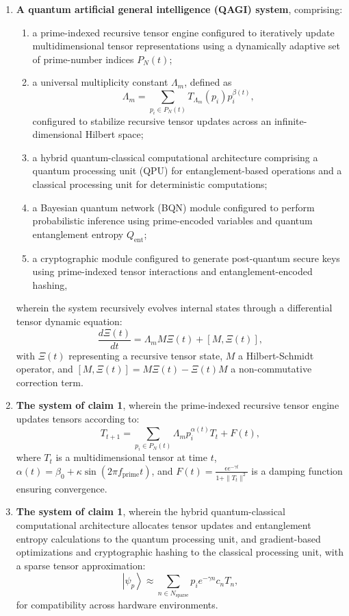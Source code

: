 \documentclass{article}
\theoremstyle{plain}
\theoremstyle{claimstyle}
\begin{document}
\begin{enumerate}

\item \textbf{A quantum artificial general intelligence (QAGI) system}, comprising:
\begin{enumerate}
    \item a prime-indexed recursive tensor engine configured to iteratively update multidimensional tensor representations using a dynamically adaptive set of prime-number indices \( P_N(t) \);
    \item a universal multiplicity constant \(\Lambda_m\), defined as 
    \[
        \Lambda_m = \sum_{p_i \in P_N(t)} T_{\Lambda_m}(p_i) p_i^{\beta(t)},
    \]
    configured to stabilize recursive tensor updates across an infinite-dimensional Hilbert space;
    \item a hybrid quantum-classical computational architecture comprising a quantum processing unit (QPU) for entanglement-based operations and a classical processing unit for deterministic computations;
    \item a Bayesian quantum network (BQN) module configured to perform probabilistic inference using prime-encoded variables and quantum entanglement entropy \( Q_{\text{ent}} \);
    \item a cryptographic module configured to generate post-quantum secure keys using prime-indexed tensor interactions and entanglement-encoded hashing,
\end{enumerate}
wherein the system recursively evolves internal states through a differential tensor dynamic equation:
\[
\frac{d\Xi(t)}{dt} = \Lambda_m M \Xi(t) + [M, \Xi(t)],
\]
with \(\Xi(t)\) representing a recursive tensor state, \(M\) a Hilbert-Schmidt operator, and \([M, \Xi(t)] = M \Xi(t) - \Xi(t) M\) a non-commutative correction term.

\item \textbf{The system of claim 1}, wherein the prime-indexed recursive tensor engine updates tensors according to:
\[
T_{t+1} = \sum_{p_i \in P_N(t)} \Lambda_m p_i^{\alpha(t)} T_t + F(t),
\]
where \( T_t \) is a multidimensional tensor at time \( t \), \( \alpha(t) = \beta_0 + \kappa \sin(2\pi f_{\text{prime}} t) \), and \( F(t) = \frac{\epsilon e^{-\gamma t}}{1 + \|T_t\|^2} \) is a damping function ensuring convergence.

\item \textbf{The system of claim 1}, wherein the hybrid quantum-classical computational architecture allocates tensor updates and entanglement entropy calculations to the quantum processing unit, and gradient-based optimizations and cryptographic hashing to the classical processing unit, with a sparse tensor approximation:
\[
\left| \psi_p \right\rangle \approx \sum_{n \in N_{\text{sparse}}} p_i e^{-\gamma n} c_n T_n,
\]
for compatibility across hardware environments.


\end{enumerate}
\end{document}
